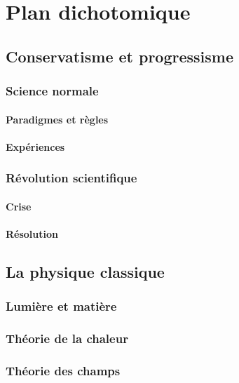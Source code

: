 \chapter{Plan dichotomique}

\section{Conservatisme et progressisme}






  \subsection{Science normale}
    \subsubsection{Paradigmes et règles}
    \subsubsection{Expériences}
  \subsection{Révolution scientifique}
    \subsubsection{Crise}
    \subsubsection{Résolution}

\section{La physique classique}
  \subsection{Lumière et matière}
  \subsection{Théorie de la chaleur}
  \subsection{Théorie des champs}

